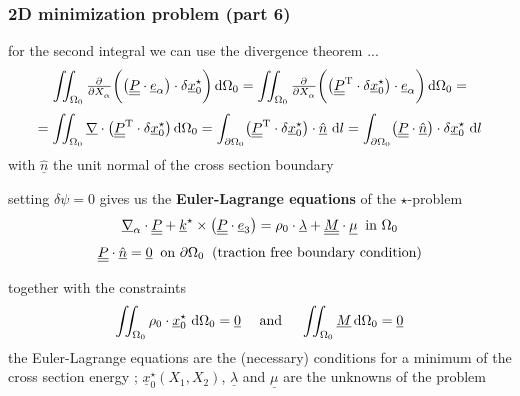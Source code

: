 \begin{frame}
  \frametitle{2D minimization problem (part 6)}

  for the second integral we can use the divergence theorem ...
  \begin{displaymath}
    \iint_{\Omega_0}
      \pd{}{X_{\alpha}} \biggl( \bigl( \doubleunderline{P} \cdot \underline{e}_{\alpha} \bigr) \cdot \delta \underline{x}_0^{\star} \biggr)
    \dif \Omega_0 =
    \iint_{\Omega_0}
      \pd{}{X_{\alpha}} \biggl( \bigl( \doubleunderline{P}^{\mathrm{T}} \cdot \delta \underline{x}_0^{\star} \bigr) \cdot \underline{e}_{\alpha} \biggr)
    \dif \Omega_0 =
  \end{displaymath}
  \begin{displaymath}
    = \iint_{\Omega_0}
      \underline{\nabla} \cdot \bigl( \doubleunderline{P}^{\mathrm{T}} \cdot \delta \underline{x}_0^{\star} \bigr)
    \dif \Omega_0 =
    \int_{\partial \Omega_0}
      \bigl( \doubleunderline{P}^{\mathrm{T}} \cdot \delta \underline{x}_0^{\star} \bigr) \cdot \underline{\hat{n}} \,
    \dif l =
    \int_{\partial \Omega_0}
      \bigl( \doubleunderline{P} \cdot \underline{\hat{n}} \bigr) \cdot \delta \underline{x}_0^{\star} \,
    \dif l
  \end{displaymath}
  with $\underline{\hat{n}}$ the unit normal of the cross section boundary
  
  \vspace{1em}
  setting $\delta \psi = 0$ gives us the \textbf{Euler-Lagrange equations} of the $\star$-problem
  \begin{displaymath}
    \underline{\nabla}_{\alpha} \cdot \underline{\underline{P}} +
    \underline{k}^{\star} \times \bigl( \underline{\underline{P}} \cdot \underline{e}_3 \bigr) =
    \rho_0 \cdot \underline{\lambda} +
    \underline{\underline{M}} \cdot \underline{\mu}
    \: \text{ in } \Omega_0    
  \end{displaymath}
  \begin{displaymath}
    \underline{\underline{P}} \cdot \underline{\hat{n}} = \underline{0}
    \: \text{ on } \partial \Omega_0
    \: \text{ (traction free boundary condition)}
  \end{displaymath}
  
  \vspace{1em}

  together with the constraints
  \begin{displaymath}
    \iint_{\Omega_0} \rho_0 \cdot \underline{x}_0^{\star} \, \dif \Omega_0 = \underline{0}
    \quad \text{ and } \quad
    \iint_{\Omega_0} \underline{M} \dif \Omega_0 = \underline{0}
  \end{displaymath}
  the Euler-Lagrange equations are the (necessary) conditions for a minimum of the cross section energy ; $\underline{x}_0^{\star}(X_1,X_2)$, $\underline{\lambda}$ and $\underline{\mu}$ are the unknowns of the problem
\end{frame}



